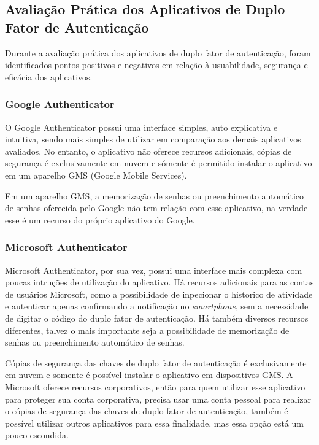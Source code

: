 \documentclass[12pt]{article}
\begin{document}
\subsection{Avaliação Prática dos Aplicativos de Duplo Fator de Autenticação}

Durante a avaliação prática dos aplicativos de duplo fator de autenticação,
foram identificados pontos positivos e negativos em relação à usuabilidade,
segurança e eficácia dos aplicativos.

\subsubsection{Google Authenticator}

O Google Authenticator possui uma interface simples, auto explicativa e intuitiva,
sendo mais simples de utilizar em comparação aos demais aplicativos avaliados.
No entanto, o aplicativo não oferece recursos adicionais, cópias de segurança
é exclusivamente em nuvem e sómente é permitido instalar o aplicativo em um
aparelho GMS (Google Mobile Services).

Em um aparelho GMS, a memorização de senhas ou preenchimento automático de
senhas oferecida pelo Google não tem relação com esse aplicativo, na verdade
esse é um recurso do próprio aplicativo do Google.

\subsubsection{Microsoft Authenticator}\label{sec:figs}

Microsoft Authenticator, por sua vez, possui uma interface mais complexa com
poucas intruções de utilização do aplicativo.
Há recursos adicionais para as contas de usuários Microsoft, como a possibilidade de
inpecionar o historico de atividade e autenticar apenas confirmando a notificação
no \textit{smartphone}, sem a necessidade de digitar o código do duplo fator de autenticação.
Há também diversos recursos diferentes, talvez o mais importante seja a possibilidade
de memorização de senhas ou preenchimento automático de senhas.

Cópias de segurança das chaves de duplo fator de autenticação é exclusivamente em
nuvem e somente é possível instalar o aplicativo em dispositivos GMS.
A Microsoft oferece recursos corporativos, então para quem utilizar esse
aplicativo para proteger sua conta corporativa, precisa usar uma conta pessoal
para realizar o cópias de segurança das chaves de duplo fator de autenticação, também
é possível utilizar outros aplicativos para essa finalidade, mas essa opção está um
pouco escondida.
\end{document}
